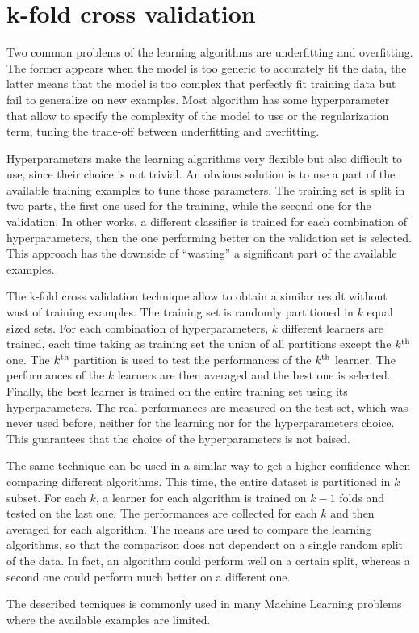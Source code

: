 \section{k-fold cross validation}
\label{sec:k_fold_cross_validation}

Two common problems of the learning algorithms are underfitting and overfitting.
The former appears when the model is too generic to accurately fit the data, the latter means that the model is too complex that perfectly fit training data but fail to generalize on new examples.
Most algorithm has some hyperparameter that allow to specify the complexity of the model to use or the regularization term, tuning the trade-off between underfitting and overfitting.

Hyperparameters make the learning algorithms very flexible but also difficult to use, since their choice is not trivial.
An obvious solution is to use a part of the available training examples to tune those parameters.
The training set is split in two parts, the first one used for the training, while the second one for the validation.
In other works, a different classifier is trained for each combination of hyperparameters, then the one performing better on the validation set is selected. 
This approach has the downside of ``wasting'' a significant part of the available examples.

The k-fold cross validation technique allow to obtain a similar result without wast of training examples.
The training set is randomly partitioned in $k$ equal sized sets.
For each combination of hyperparameters, $k$ different learners are trained, each time taking as training set the union of all partitions except the $k\textsuperscript{th}$ one.
The $k\textsuperscript{th}$ partition is used to test the performances of the $k\textsuperscript{th}$ learner.
The performances of the $k$ learners are then averaged and the best one is selected.
Finally, the best learner is trained on the entire training set using its hyperparameters.
The real performances are measured on the test set, which was never used before, neither for the learning nor for the hyperparameters choice.
This guarantees that the choice of the hyperparameters is not baised.

The same technique can be used in a similar way to get a higher confidence when comparing different algorithms.
This time, the entire dataset is partitioned in $k$ subset.
For each $k$, a learner for each algorithm is trained on $k-1$ folds and tested on the last one.
The performances are collected for each $k$ and then averaged for each algorithm.
The means are used to compare the learning algorithms, so that the comparison does not dependent on a single random split of the data.
In fact, an algorithm could perform well on a certain split, whereas a second one could perform much better on a different one.

The described tecniques is commonly used in many Machine Learning problems where the available examples are limited.
